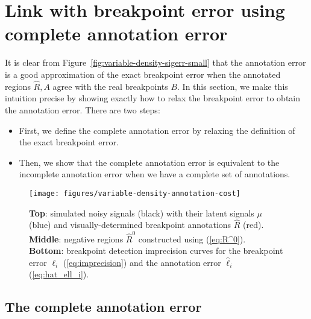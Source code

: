 \documentclass{jsfds} %
\begin{document}
\section{Link with breakpoint error using 
complete annotation error}
\label{sec:complete}
It is clear from Figure~\ref{fig:variable-density-sigerr-small} that
the annotation error is a good approximation of the exact breakpoint
error when the annotated regions $\hat R,A$ agree with the real
breakpoints $B$. In this section, we make this intuition precise by
showing exactly how to relax the breakpoint error to obtain the
annotation error. There are two steps:
\begin{itemize}
\item First, we define the complete annotation error by relaxing the
  definition of the exact breakpoint error.
\item Then, we show that the complete annotation error is equivalent
  to the incomplete annotation error when we have a complete set of
  annotations.
\end{itemize}

\begin{figure}[b!]
  \centering
\texttt{[image: figures/variable-density-annotation-cost]}
%
\vskip -0.1in
  \caption{\textbf{Top}: simulated noisy
  signals (black) with their latent signals $\mu$ (blue) and
  visually-determined breakpoint annotations $\hat R$
  (red). 
\protect\\
\textbf{Middle}: negative regions $\hat R^0$ constructed
  using (\ref{eq:R^0}).
\protect\\
\textbf{Bottom}: breakpoint detection
  imprecision curves for the breakpoint error $\ell_i$
  (\ref{eq:imprecision}) and the annotation error $\hat
  \ell_i$ (\ref{eq:hat_ell_i}).}
\label{fig:variable-density-annotation-cost}
\end{figure}

\subsection{The complete annotation error}
\end{document}
